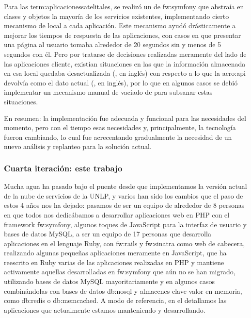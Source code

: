 Para las \gls{term:aplicacionessatelitales}, se realizó un  de \gls{fw:symfony} que abstraía en clases y objetos la mayoría de los servicios existentes, implementando cierto mecanismo de  local a cada aplicación. Este mecanismo ayudó drásticamente a mejorar los tiempos de respuesta de las aplicaciones, con casos en que presentar una página al usuario tomaba alrededor de 20 segundos sin  y menos de 5 segundos con él. Pero por tratarse de decisiones realizadas meramente del lado de las aplicaciones cliente, existían situaciones en las que la información almacenada en esa  local quedaba desactualizada (, en inglés) con respecto a lo que la \gls{acro:api} devolvía como el dato actual (, en inglés), por lo que en algunos casos se debió implementar un mecanismo manual de vaciado de  para subsanar estas situaciones.

En resumen: la implementación fue adecuada y funcional para las necesidades del momento, pero con el tiempo esas necesidades y, principalmente, la tecnología fueron cambiando, lo cual fue acrecentando gradualmente la necesidad de un nuevo análisis y replanteo para la solución actual.


\subsubsection{Cuarta iteración: este trabajo}
\label{nube:etapa4}

Mucha agua ha pasado bajo el puente desde que implementamos la versión actual de la nube de servicios de la UNLP, y varios han sido los cambios que el paso de estos 4 años nos ha dejado: pasamos de ser un equipo de alrededor de 8 personas en que todos nos dedicábamos a desarrollar aplicaciones web en PHP con el framework \gls{fw:symfony}, algunos toques de JavaScript para la interfaz de usuario y bases de datos MySQL, a ser un equipo de 17 personas que desarrolla aplicaciones en el lenguaje Ruby, con \gls{fw:rails} y \gls{fw:sinatra} como  web de cabecera, realizando algunas pequeñas aplicaciones meramente en JavaScript, que ha reescrito en Ruby varias de las aplicaciones realizadas en PHP y mantiene activamente aquellas desarrolladas en \gls{fw:symfony} que aún no se han migrado, utilizando bases de datos MySQL mayoritariamente y en algunos casos combinándolas con bases de datos \gls{db:nosql} y almacenes clave-valor en memoria, como \gls{db:redis} o \gls{db:memcached}. A modo de referencia, en el   detallamos las aplicaciones que actualmente estamos manteniendo y desarrollando.

